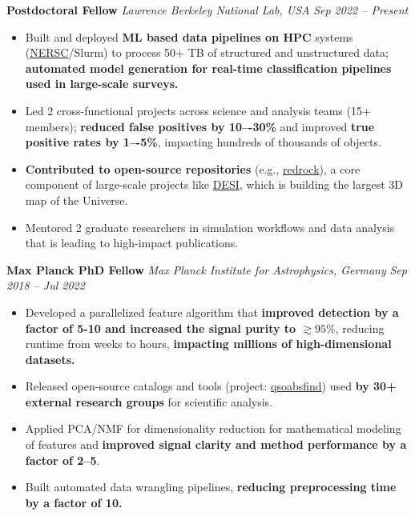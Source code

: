 \documentclass[a4paper,10pt]{article}
\begin{document}
\textcolor{sectionblue}{\textbf{Postdoctoral Fellow }} \hfill \textcolor{sectionblue}{\textit{Lawrence Berkeley National Lab, USA}} \hfill \textcolor{sectionblue}{\textit{Sep 2022 – Present}}
\begin{itemize}
    \item Built and deployed \textbf{ML based data pipelines on HPC} systems (\href{https://www.nersc.gov/}{NERSC}/Slurm) to process 50+ TB of structured and unstructured data; \textbf{automated model generation for real-time classification pipelines used in large-scale surveys.}
    \vspace*{-1mm}
    \item Led 2 cross-functional projects across science and analysis teams (15+ members); \textbf{reduced false positives by 10–-30\%} and improved \textbf{true positive rates by 1–-5\%}, impacting hundreds of thousands of objects.
    \vspace*{-1mm}
     \item \textbf{Contributed to open-source repositories} (e.g., \href{https://github.com/desihub/redrock}{redrock}), a core component of large-scale projects like \href{https://en.wikipedia.org/wiki/Dark_Energy_Spectroscopic_Instrument}{DESI}, which is building the largest 3D map of the Universe.
    \vspace*{-1mm}
    \item Mentored 2 graduate researchers in simulation workflows and data analysis that is leading to high-impact publications.
    
\end{itemize}
    
\vspace{2mm}
\textcolor{sectionblue}{\textbf{Max Planck PhD Fellow}} \hfill \textcolor{sectionblue}{\textit{Max Planck Institute for Astrophysics, Germany}} \hfill \textcolor{sectionblue}{\textit{Sep 2018 – Jul 2022}}

\begin{itemize}

    \item Developed a parallelized feature algorithm that \textbf{improved detection by a factor of 5-10 and increased the signal purity to $\gtrsim 95\%$}, reducing runtime from weeks to hours, \textbf{impacting millions of high-dimensional datasets.}
    \vspace*{-1mm}
    \item Released open-source catalogs and tools (project: \href{https://github.com/abhi0395/qsoabsfind}{qsoabsfind}) used \textbf{by 30+ external research groups} for scientific analysis.
    \vspace*{-1mm}
    \item Applied PCA/NMF for dimensionality reduction for mathematical modeling of features and \textbf{improved signal clarity and method performance by a factor of 2--5}.
    \vspace*{-1mm}
  \item Built automated data wrangling pipelines, \textbf{reducing preprocessing time by a factor of 10.}
    
\end{itemize}
\end{document}
